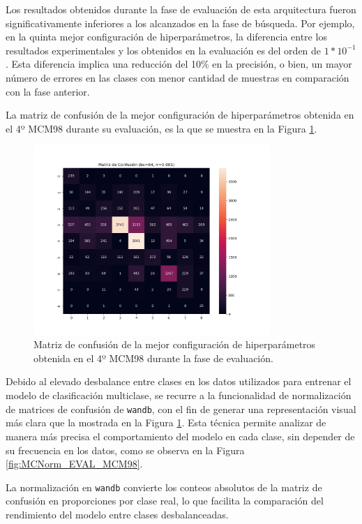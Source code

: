 Los resultados obtenidos durante la fase de evaluación de esta arquitectura fueron significativamente inferiores a los alcanzados en la fase de búsqueda. Por ejemplo, en la quinta mejor configuración de hiperparámetros, la diferencia entre los resultados experimentales y los obtenidos en la evaluación es del orden de $1*10^{-1}$. Esta diferencia implica una reducción del 10\% en la precisión, o bien, un mayor número de errores en las clases con menor cantidad de muestras en comparación con la fase anterior.


La matriz de confusión de la mejor configuración de hiperparámetros obtenida en el 4º MCM98 durante su evaluación, es la que se muestra en la Figura \ref{fig:MC_EVAL_MCM98}.

\begin{figure}[H]
    \centering
    \includegraphics[width=0.8\textwidth]{./img/evaluacion/matrices_confusion/MC_EVAL_MCM98.png}
    \caption{Matriz de confusión de la mejor configuración de hiperparámetros obtenida en el 4º MCM98 durante la fase de evaluación.}
    \label{fig:MC_EVAL_MCM98}
\end{figure}

Debido al elevado desbalance entre clases en los datos utilizados para entrenar el modelo de clasificación multiclase, se recurre a la funcionalidad de normalización de matrices de confusión de \texttt{wandb}, con el fin de generar una representación visual más clara que la mostrada en la Figura \ref{fig:MC_EVAL_MCM98}. Esta técnica permite analizar de manera más precisa el comportamiento del modelo en cada clase, sin depender de su frecuencia en los datos, como se observa en la Figura \ref{fig:MCNorm_EVAL_MCM98}.

La normalización en \texttt{wandb} convierte los conteos absolutos de la matriz de confusión en proporciones por clase real, lo que facilita la comparación del rendimiento del modelo entre clases desbalanceadas.

